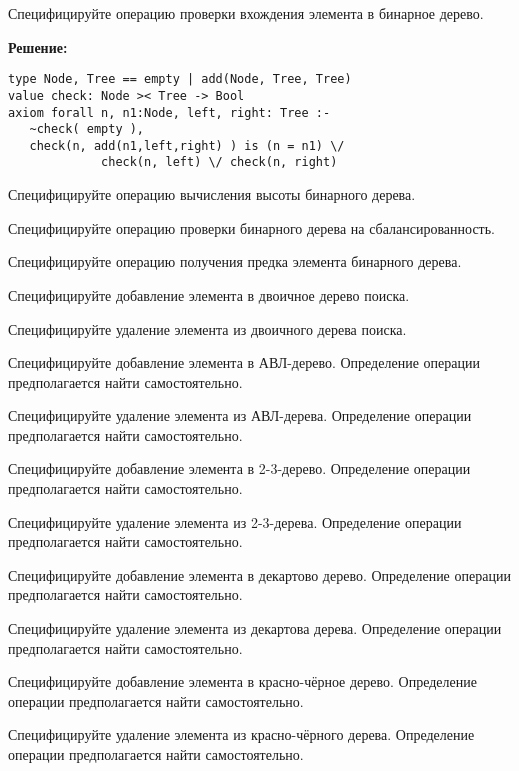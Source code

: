 \z Специфицируйте операцию проверки вхождения элемента в бинарное дерево.

\textbf{Решение:}
\begin{lstlisting}
type Node, Tree == empty | add(Node, Tree, Tree)
value check: Node >< Tree -> Bool
axiom forall n, n1:Node, left, right: Tree :-
   ~check( empty ),
   check(n, add(n1,left,right) ) is (n = n1) \/
             check(n, left) \/ check(n, right)
\end{lstlisting}

\z Специфицируйте операцию вычисления высоты бинарного дерева.

\z Специфицируйте операцию проверки бинарного дерева на сбалансированность.

\z Специфицируйте операцию получения предка элемента бинарного дерева.

\z Специфицируйте добавление элемента в двоичное дерево поиска.

\z Специфицируйте удаление элемента из двоичного дерева поиска.

\z Специфицируйте добавление элемента в АВЛ-дерево. Определение операции предполагается найти самостоятельно.

\z Специфицируйте удаление элемента из АВЛ-дерева. Определение операции предполагается найти самостоятельно.

\z Специфицируйте добавление элемента в 2-3-дерево. Определение операции предполагается найти самостоятельно.

\z Специфицируйте удаление элемента из 2-3-дерева. Определение операции предполагается найти самостоятельно.

\z Специфицируйте добавление элемента в декартово дерево. Определение операции предполагается найти самостоятельно.

\z Специфицируйте удаление элемента из декартова дерева. Определение операции предполагается найти самостоятельно.

\z Специфицируйте добавление элемента в красно-чёрное дерево.  Определение операции предполагается найти самостоятельно.

\z Специфицируйте удаление элемента из красно-чёрного дерева.  Определение операции предполагается найти самостоятельно.

